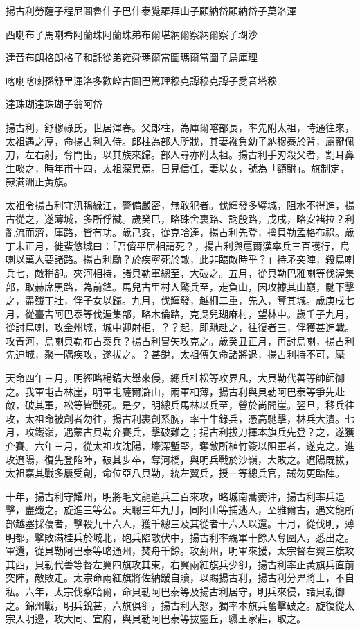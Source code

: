 
\begin{pinyinscope}
揚古利勞薩子程尼圖魯什子巴什泰覺羅拜山子顧納岱顧納岱子莫洛渾

西喇布子馬喇希阿蘭珠阿蘭珠弟布爾堪納爾察納爾察子瑚沙

達音布朗格朗格子和託從弟雍舜瑪爾當圖瑪爾當圖子烏庫理

喀喇喀喇孫舒里渾洛多歡崆古圖巴篤理穆克譚穆克譚子愛音塔穆

達珠瑚達珠瑚子翁阿岱

揚古利，舒穆祿氏，世居渾春。父郎柱，為庫爾喀部長，率先附太祖，時通往來，太祖遇之厚，命揚古利入侍。郎柱為部人所戕，其妻襁負幼子納穆泰於背，屬鞬佩刀，左右射，奪門出，以其族來歸。部人尋亦附太祖。揚古利手刃殺父者，割耳鼻生啖之，時年甫十四，太祖深異焉。日見信任，妻以女，號為「額駙」。旗制定，隸滿洲正黃旗。

太祖令揚古利守汛鴨綠江，警備嚴密，無敢犯者。伐輝發多璧城，阻水不得進，揚古從之，遂薄城，多所俘馘。歲癸巳，略硃舍裏路、訥殷路，戊戌，略安褚拉？利亂流而濟，庫路，皆有功。歲己亥，從克哈達，揚古利先登，擒貝勒孟格布祿。歲丁未正月，徙蜚悠城曰：「吾儕平居相謂死？，揚古利與扈爾漢率兵三百護行，烏喇以萬人要諸路。揚古利勵？於疾寧死於敵，此非臨敵時乎？」持矛突陣，殺烏喇兵七，敵稍卻。夾河相持，諸貝勒軍總至，大破之。五月，從貝勒巴雅喇等伐渥集部，取赫席黑路，為前鋒。馬兒古里村人驚兵至，走負山，因攻據其山巔，馳下擊之，盡殲丁壯，俘子女以歸。九月，伐輝發，越柵二重，先入，奪其城。歲庚戌七月，從臺吉阿巴泰等伐渥集部，略木倫路，克吳兒瑚麻村，望林中。歲壬子九月，從討烏喇，攻金州城，城中迎射拒，？？起，即馳赴之，往復者三，俘獲甚進戰。攻青河，烏喇貝勒布占泰兵？揚古利冒矢攻克之。歲癸丑正月，再討烏喇，揚古利先迫城，聚一隅疾攻，遂拔之。？甚銳，太祖傳矢命諸將退，揚古利持不可，麾

天命四年三月，明經略楊鎬大舉來侵，總兵杜松等攻界凡，大貝勒代善等帥師御之。我軍屯吉林崖，明軍屯薩爾滸山，兩軍相薄，揚古利與貝勒阿巴泰等爭先赴敵，破其軍，松等皆戰死。是夕，明總兵馬林以兵至，營於尚間崖。翌旦，移兵往攻，太祖命被創者勿往，揚古利裹創系腕，率十牛錄兵，憑高馳擊，林兵大潰。七月，攻鐵嶺，遇蒙古貝勒介賽兵，擊破難之；揚古利拔刀揮本旗兵先登？之，遂獲介賽。六年三月，從太祖攻沈陽，壕深塹堅，奪敵所植竹簽以阻軍者，遂克之。進攻遼陽，復先登陷陣，破其步卒，奪河橋，與明兵戰於沙嶺，大敗之。遼陽既拔，太祖嘉其戰多屢受創，命位亞八貝勒，統左翼兵，授一等總兵官，誡勿更臨陣。

十年，揚古利守耀州，明將毛文龍遣兵三百來攻，略城南蕎麥沖，揚古利率兵追擊，盡殲之。旋進三等公。天聰三年九月，同阿山等捕逃人，至雅爾古，遇文龍所部越塞採葠者，擊殺九十六人，獲千總三及其從者十六人以還。十月，從伐明，薄明都，擊敗滿桂兵於城北，砲兵陷敵伏中，揚古利率親軍十餘人奪圍入，悉出之。軍還，從貝勒阿巴泰等略通州，焚舟千餘。攻薊州，明軍來援，太宗督右翼三旗攻其西，貝勒代善等督左翼四旗攻其東，右翼兩紅旗兵少卻，揚古利率正黃旗兵直前突陣，敵敗走。太宗命兩紅旗將佐納鍰自贖，以賜揚古利，揚古利分畀將士，不自私。六年，太宗伐察哈爾，命貝勒阿巴泰等及揚古利居守，明兵來侵，諸貝勒御之。錦州戰，明兵銳甚，六旗俱卻，揚古利大怒，獨率本旗兵奮擊破之。旋復從太宗入明邊，攻大同、宣府，與貝勒阿巴泰等拔靈丘，隳王家莊，取之。


\end{pinyinscope}
